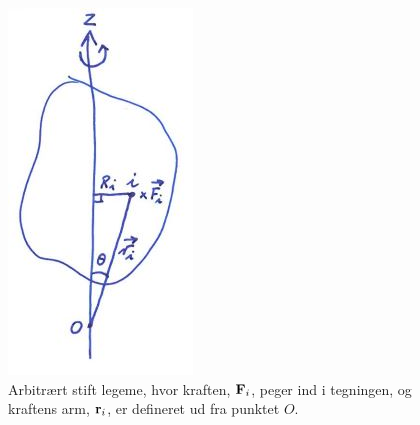 \begin{figure}[h!]
\centering
\includegraphics[width=.22\textwidth]{RotationelMekanik/Stift-legeme}
\caption{Arbitrært stift legeme, hvor kraften, $\mathbf{F}_i$, peger ind i tegningen, og kraftens arm, $\mathbf{r}_i$, er defineret ud fra punktet $O$.}
\label{fig:Stift-legeme}
\end{figure}

